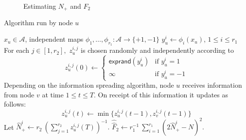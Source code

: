 \documentclass[10pt,twosided,a4paper,draft,onecolumn]{article}
\newcommand{\exprand}[1]{\mathsf{exprand}(#1)}
\newcommand{\myunit}{1 cm}
\begin{document}
\begin{figure}[h]
\begin{center}
\end{center}
\caption{Estimating $N_+$ and $F_2$}
\label{fig:estimate}
\end{figure}


\begin{algorithm} 
  \caption{Algorithm run by node $u$}{\label{alg:f2}}
  \begin{algorithmic}[1] 
    \REQUIRE $x_u \in \mathcal{A}$, independent maps $\phi_1, \ldots ,
    \phi_{r_1} : \mathcal{A} \rightarrow \{+1,-1\}$ 
    \STATE $y_u^i \gets \phi_{i}(x_u)$, $1 \leq i \leq r_1$ 
    \STATE For each $j \in [1,r_2],$ $z_u^{i,j}$ is chosen randomly
    and independently according to 
\begin{equation*}
      z_u^{i,j}(0) \gets \begin{cases}
        \exprand{y_u^i} & \mbox{if } y_u^i =1 \\
        \infty & \mbox{if } y_u^i = -1
      \end{cases}
    \end{equation*}
\STATE Depending on the information spreading algorithm, node $u$
    receives information from node $v$ at time $1 \leq t \leq T.$ On
    receipt of this information it updates as follows:
\begin{displaymath}
      z_u^{i,j}(t) \gets \min\{z_u^{i,j}(t-1),z_v^{i,j}(t-1)\}
    \end{displaymath}
\STATE Let $\hat{N}_+^{i} \gets  r_2 \ \left(
      \sum \limits_{j=1}^{r_2} z_u^{i,j}(T) \right)^{-1}.$ 
    \STATE $\hat{\hat{F}}_2 \gets r_1^{-1} \ \sum \limits_{i=1}^{r_1}
    \left(2\hat{N}_+^i -N \right)^2.$   
  \end{algorithmic}
\end{algorithm}
\end{document}
